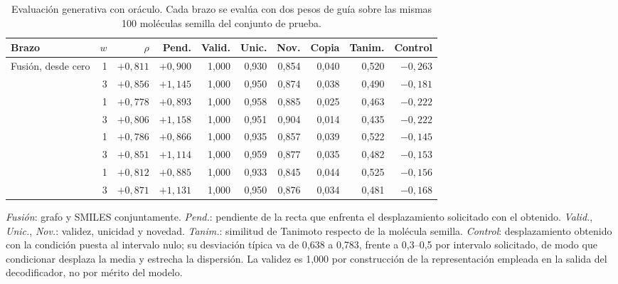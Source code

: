 \begin{table}[htbp]
  \centering
  \caption{Evaluación generativa con oráculo. Cada brazo se evalúa con dos
           pesos de guía sobre las mismas 100 moléculas semilla del conjunto
           de prueba.}
  \label{tab:c1-oraculo}
  \setlength{\tabcolsep}{3.5pt}
  \footnotesize
  \begin{tabular}{@{}lrrrrrrrrr@{}}
    \toprule
    Brazo & $w$ & $\rho$ & Pend. & Valid. & Unic. & Nov. & Copia & Tanim. & Control \\
    \midrule
    \multirow{2}{*}{Fusión, desde cero}
      & 1 & $+0{,}811$ & $+0{,}900$ & 1,000 & 0,930 & 0,854 & 0,040 & 0,520 & $-0{,}263$ \\
      & 3 & $+0{,}856$ & $+1{,}145$ & 1,000 & 0,950 & 0,874 & 0,038 & 0,490 & $-0{,}181$ \\
    \addlinespace
    \multirow{2}{*}{Fusión, preentrenado}
      & 1 & $+0{,}778$ & $+0{,}893$ & 1,000 & 0,958 & 0,885 & 0,025 & 0,463 & $-0{,}222$ \\
      & 3 & $+0{,}806$ & $+1{,}158$ & 1,000 & 0,951 & 0,904 & 0,014 & 0,435 & $-0{,}222$ \\
    \addlinespace
    \multirow{2}{*}{Solo grafo}
      & 1 & $+0{,}786$ & $+0{,}866$ & 1,000 & 0,935 & 0,857 & 0,039 & 0,522 & $-0{,}145$ \\
      & 3 & $+0{,}851$ & $+1{,}114$ & 1,000 & 0,959 & 0,877 & 0,035 & 0,482 & $-0{,}153$ \\
    \addlinespace
    \multirow{2}{*}{Solo SMILES}
      & 1 & $+0{,}812$ & $+0{,}885$ & 1,000 & 0,933 & 0,845 & 0,044 & 0,525 & $-0{,}156$ \\
      & 3 & $+0{,}871$ & $+1{,}131$ & 1,000 & 0,950 & 0,876 & 0,034 & 0,481 & $-0{,}168$ \\
    \bottomrule
  \end{tabular}

  \vspace{0.4em}
  \begin{minipage}{0.95\textwidth}
    \footnotesize
    \textit{Fusión}: grafo y SMILES conjuntamente. \textit{Pend.}: pendiente de la
    recta que enfrenta el desplazamiento solicitado con el obtenido.
    \textit{Valid.}, \textit{Unic.}, \textit{Nov.}: validez, unicidad y novedad.
    \textit{Tanim.}: similitud de Tanimoto respecto de la molécula semilla.
    \textit{Control}: desplazamiento obtenido con la condición puesta al
    intervalo nulo; su desviación típica va de 0,638 a 0,783, frente a 0,3--0,5 por
    intervalo solicitado, de modo que condicionar desplaza la media y estrecha la
    dispersión. La validez es 1,000 por construcción de la representación empleada en
    la salida del decodificador, no por mérito del modelo.
  \end{minipage}
\end{table}


